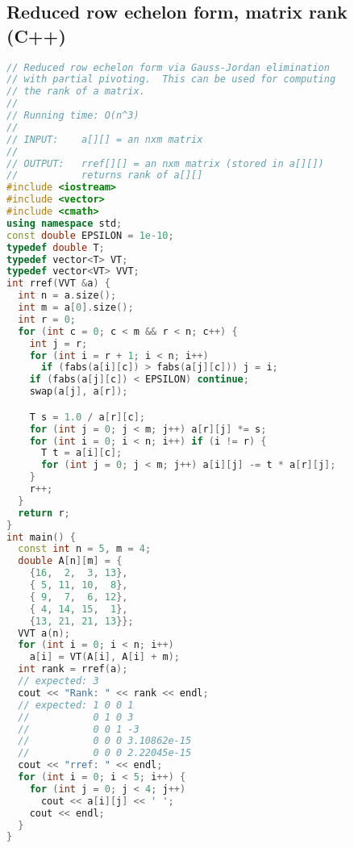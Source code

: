 \subsection{Reduced row echelon form, matrix rank (C++)}
\begin{lstlisting}[language=C++]
// Reduced row echelon form via Gauss-Jordan elimination 
// with partial pivoting.  This can be used for computing
// the rank of a matrix.
//
// Running time: O(n^3)
//
// INPUT:    a[][] = an nxm matrix
//
// OUTPUT:   rref[][] = an nxm matrix (stored in a[][])
//           returns rank of a[][]
#include <iostream>
#include <vector>
#include <cmath>
using namespace std;
const double EPSILON = 1e-10;
typedef double T;
typedef vector<T> VT;
typedef vector<VT> VVT;
int rref(VVT &a) {
  int n = a.size();
  int m = a[0].size();
  int r = 0;
  for (int c = 0; c < m && r < n; c++) {
    int j = r;
    for (int i = r + 1; i < n; i++)
      if (fabs(a[i][c]) > fabs(a[j][c])) j = i;
    if (fabs(a[j][c]) < EPSILON) continue;
    swap(a[j], a[r]);

    T s = 1.0 / a[r][c];
    for (int j = 0; j < m; j++) a[r][j] *= s;
    for (int i = 0; i < n; i++) if (i != r) {
      T t = a[i][c];
      for (int j = 0; j < m; j++) a[i][j] -= t * a[r][j];
    }
    r++;
  }
  return r;
}
int main() {
  const int n = 5, m = 4;
  double A[n][m] = {
    {16,  2,  3, 13},
    { 5, 11, 10,  8},
    { 9,  7,  6, 12},
    { 4, 14, 15,  1},
    {13, 21, 21, 13}};
  VVT a(n);
  for (int i = 0; i < n; i++)
    a[i] = VT(A[i], A[i] + m);
  int rank = rref(a);
  // expected: 3
  cout << "Rank: " << rank << endl;
  // expected: 1 0 0 1 
  //           0 1 0 3 
  //           0 0 1 -3 
  //           0 0 0 3.10862e-15
  //           0 0 0 2.22045e-15
  cout << "rref: " << endl;
  for (int i = 0; i < 5; i++) {
    for (int j = 0; j < 4; j++)
      cout << a[i][j] << ' ';
    cout << endl;
  }
}
\end{lstlisting}
